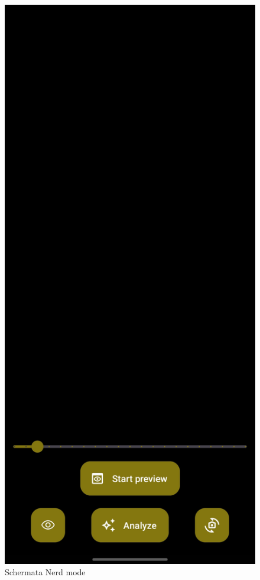 \documentclass[11pt]{article}
\begin{document}
\begin{figure}[h]
\caption{Schermata Nerd mode }
\centering
\includegraphics[scale=0.15]{img/CameraApp_Screen_nerd_layout.jpg}
\end{figure}
\end{document}
